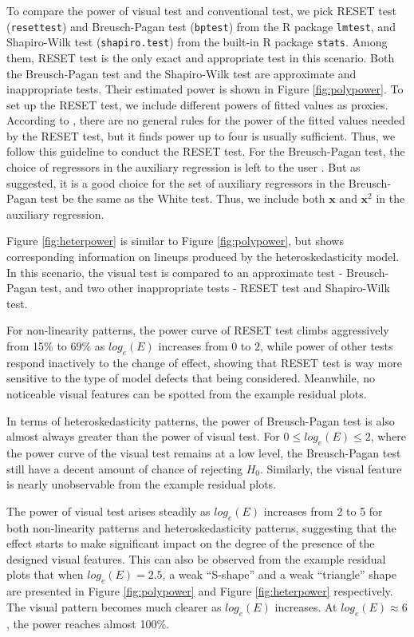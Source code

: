 \documentclass[]{interact}
\theoremstyle{plain}%
\theoremstyle{definition}
\theoremstyle{remark}
\begin{document}
To compare the power of visual test and conventional test, we pick RESET
test (\texttt{resettest}) and Breusch-Pagan test (\texttt{bptest}) from
the R package \texttt{lmtest}, and Shapiro-Wilk test
(\texttt{shapiro.test}) from the built-in R package \texttt{stats}.
Among them, RESET test is the only exact and appropriate test in this
scenario. Both the Breusch-Pagan test and the Shapiro-Wilk test are
approximate and inappropriate tests. Their estimated power is shown in
Figure \ref{fig:polypower}. To set up the RESET test, we include
different powers of fitted values as proxies. According to
\citet{ramsey_tests_1969}, there are no general rules for the power of
the fitted values needed by the RESET test, but it finds power up to
four is usually sufficient. Thus, we follow this guideline to conduct
the RESET test. For the Breusch-Pagan test, the choice of regressors in
the auxiliary regression is left to the user
\citep{breusch_simple_1979}. But as \citet{waldman1983note} suggested,
it is a good choice for the set of auxiliary regressors in the
Breusch-Pagan test be the same as the White test. Thus, we include both
\(\boldsymbol{x}\) and \(\boldsymbol{x}^2\) in the auxiliary regression.

Figure \ref{fig:heterpower} is similar to Figure \ref{fig:polypower},
but shows corresponding information on lineups produced by the
heteroskedasticity model. In this scenario, the visual test is compared
to an approximate test - Breusch-Pagan test, and two other inappropriate
tests - RESET test and Shapiro-Wilk test.

For non-linearity patterns, the power curve of RESET test climbs
aggressively from 15\% to 69\% as \(log_e(E)\) increases from 0 to 2,
while power of other tests respond inactively to the change of effect,
showing that RESET test is way more sensitive to the type of model
defects that being considered. Meanwhile, no noticeable visual features
can be spotted from the example residual plots.

In terms of heteroskedasticity patterns, the power of Breusch-Pagan test
is also almost always greater than the power of visual test. For
\(0 \leq log_e(E) \leq 2\), where the power curve of the visual test
remains at a low level, the Breusch-Pagan test still have a decent
amount of chance of rejecting \(H_0\). Similarly, the visual feature is
nearly unobservable from the example residual plots.

The power of visual test arises steadily as \(log_e(E)\) increases from
2 to 5 for both non-linearity patterns and heteroskedasticity patterns,
suggesting that the effect starts to make significant impact on the
degree of the presence of the designed visual features. This can also be
observed from the example residual plots that when \(log_e(E) = 2.5\), a
weak ``S-shape'' and a weak ``triangle'' shape are presented in Figure
\ref{fig:polypower} and Figure \ref{fig:heterpower} respectively. The
visual pattern becomes much clearer as \(log_e(E)\) increases. At
\(log_e(E) \approx 6\), the power reaches almost 100\%.
\end{document}
